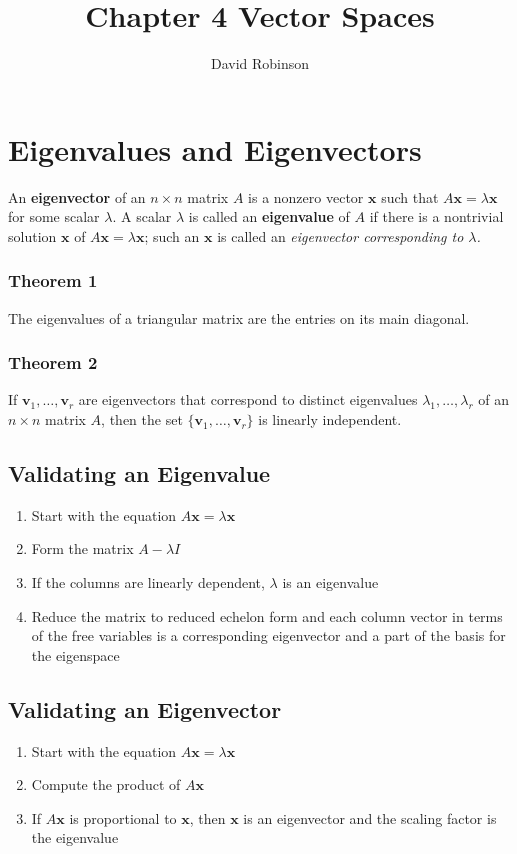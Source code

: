 \documentclass{article}
\title{Chapter 4 Vector Spaces}
\author{David Robinson}
\date{}
\begin{document}
\maketitle

\section*{Eigenvalues and Eigenvectors}

An \textbf{eigenvector} of an $n\times n$ matrix $A$ is a nonzero vector $\mathbf{x}$ such that $A\mathbf{x}=\lambda\mathbf{x}$ for some scalar $\lambda$. A scalar $\lambda$ is called an \textbf{eigenvalue} of $A$ if there is a nontrivial solution $\mathbf{x}$ of $A\mathbf{x}=\lambda\mathbf{x}$; such an $\mathbf{x}$ is called an \textit{eigenvector corresponding to $\lambda$.}

\subsubsection*{Theorem 1}
The eigenvalues of a triangular matrix are the entries on its main diagonal.

\subsubsection*{Theorem 2}
If $\mathbf{v}_1, \ldots, \mathbf{v}_r$ are eigenvectors that correspond to distinct eigenvalues $\lambda_1, \ldots, \lambda_r$ of an $n\times n$ matrix $A$, then the set $\{\mathbf{v}_1, \ldots, \mathbf{v}_r\}$ is linearly independent.

\subsection*{Validating an Eigenvalue}
\begin{enumerate}
    \item Start with the equation $A\mathbf{x}=\lambda \mathbf{x}$
    \item Form the matrix $A-\lambda I$
    \item If the columns are linearly dependent, $\lambda$ is an eigenvalue
    \item Reduce the matrix to reduced echelon form and each column vector in terms of the free variables is a corresponding eigenvector and a part of the basis for the eigenspace
\end{enumerate}

\subsection*{Validating an Eigenvector}
\begin{enumerate}
    \item Start with the equation $A\mathbf{x}=\lambda\mathbf{x}$
    \item Compute the product of $A\mathbf{x}$
    \item If $A\mathbf{x}$ is proportional to $\mathbf{x}$, then $\mathbf{x}$ is an eigenvector and the scaling factor is the eigenvalue
\end{enumerate}
\end{document}
